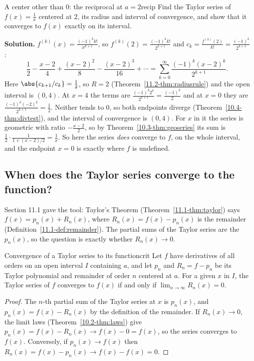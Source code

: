 \documentclass[11pt]{article}
\begin{document}
\begin{exmp}{A center other than $0$: the reciprocal at $a=2$}{recip}
Find the Taylor series of $f(x)=\frac1x$ centered at $2$, its radius and interval of convergence, and show that it converges to $f(x)$ exactly on its interval.

\textbf{Solution.} $f^{(k)}(x)=\frac{(-1)^kk!}{x^{k+1}}$, so $f^{(k)}(2)=\frac{(-1)^kk!}{2^{k+1}}$ and $c_k=\frac{f^{(k)}(2)}{k!}=\frac{(-1)^k}{2^{k+1}}$:
\[
\frac12-\frac{x-2}4+\frac{(x-2)^2}8-\frac{(x-2)^3}{16}+\cdots=\sum_{k=0}^\infty\frac{(-1)^k(x-2)^k}{2^{k+1}} .
\]
Here $\abs{c_{k+1}/c_k}=\frac12$, so $R=2$ (Theorem~\ref{11.2-thm:radiusrule}) and the open interval is $(0,4)$. At $x=4$ the terms are $\frac{(-1)^k2^k}{2^{k+1}}=\frac{(-1)^k}2$ and at $x=0$ they are $\frac{(-1)^k(-2)^k}{2^{k+1}}=\frac12$. Neither tends to $0$, so both endpoints diverge (Theorem~\ref{10.4-thm:divtest}), and the interval of convergence is $(0,4)$. For $x$ in it the series is geometric with ratio $-\frac{x-2}2$, so by Theorem~\ref{10.3-thm:geoseries} its sum is $\frac12\cdot\frac1{1+(x-2)/2}=\frac1x$. So here the series \emph{does} converge to $f$, on the whole interval, and the endpoint $x=0$ is exactly where $f$ is undefined.
\end{exmp}

\subsection*{When does the Taylor series converge to the function?}

Section 11.1 gave the tool: Taylor's Theorem (Theorem~\ref{11.1-thm:taylor}) says $f(x)=p_n(x)+R_n(x)$, where $R_n(x)=f(x)-p_n(x)$ is the remainder (Definition~\ref{11.1-def:remainder}). The partial sums of the Taylor series are the $p_n(x)$, so the question is exactly whether $R_n(x)\to0$.

\begin{thm}{Convergence of a Taylor series to its function}{crit}
Let $f$ have derivatives of all orders on an open interval $I$ containing $a$, and let $p_n$ and $R_n=f-p_n$ be its Taylor polynomial and remainder of order $n$ centered at $a$. For a given $x$ in $I$, the Taylor series of $f$ converges to $f(x)$ if and only if $\lim_{n\to\infty}R_n(x)=0$.
\end{thm}
\begin{proof}
The $n$-th partial sum of the Taylor series at $x$ is $p_n(x)$, and $p_n(x)=f(x)-R_n(x)$ by the definition of the remainder. If $R_n(x)\to0$, the limit laws (Theorem~\ref{10.2-thm:laws}) give $p_n(x)=f(x)-R_n(x)\to f(x)-0=f(x)$, so the series converges to $f(x)$. Conversely, if $p_n(x)\to f(x)$ then $R_n(x)=f(x)-p_n(x)\to f(x)-f(x)=0$.
\end{proof}
\end{document}

